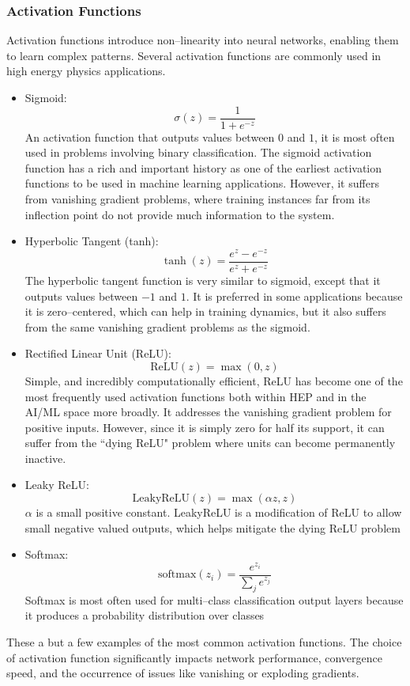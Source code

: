         \subsubsection{Activation Functions}
            Activation functions introduce non--linearity into neural networks, enabling them to learn complex patterns.
            Several activation functions are commonly used in high energy physics applications.
            \begin{itemize}
                \item Sigmoid:
                    \[\sigma(z) = \frac{1}{1 + e^{-z}}\]
                    An activation function that outputs values between \(0\) and \(1\), it is most often used in problems involving binary classification.
                    The sigmoid activation function has a rich and important history as one of the earliest activation functions to be used in machine learning applications.
                    However, it suffers from vanishing gradient problems, where training instances far from its inflection point do not provide much information to the system.

                \item Hyperbolic Tangent (tanh): \[\tanh(z) = \frac{e^z - e^{-z}}{e^z + e^{-z}}\]
                    The hyperbolic tangent function is very similar to sigmoid, except that it outputs values between \(-1\) and \(1\).
                    It is preferred in some applications because it is zero--centered, which can help in training dynamics, but it also suffers from the same vanishing gradient problems as the sigmoid.
                \item Rectified Linear Unit (ReLU): \[\text{ReLU}(z) = \max(0, z)\]
                    Simple, and incredibly computationally efficient, ReLU has become one of the most frequently used activation functions both within HEP and in the AI/ML space more broadly.
                    It addresses the vanishing gradient problem for positive inputs.
                    However, since it is simply zero for half its support, it can suffer from the ``dying ReLU" problem where units can become permanently inactive.
                \item Leaky ReLU: \[\text{LeakyReLU}(z) = \max(\alpha z, z)\]
                    \(\alpha\) is a small positive constant.
                    LeakyReLU is a modification of ReLU to allow small negative valued outputs, which helps mitigate the dying ReLU problem
                \item Softmax: \[\text{softmax}(z_i) = \frac{e^{z_i}}{\sum_{j} e^{z_j}}\]
                        Softmax is most often used for multi--class classification output layers because it produces a probability distribution over classes
            \end{itemize}
            These a but a few examples of the most common activation functions.
            The choice of activation function significantly impacts network performance, convergence speed, and the occurrence of issues like vanishing or exploding gradients.
